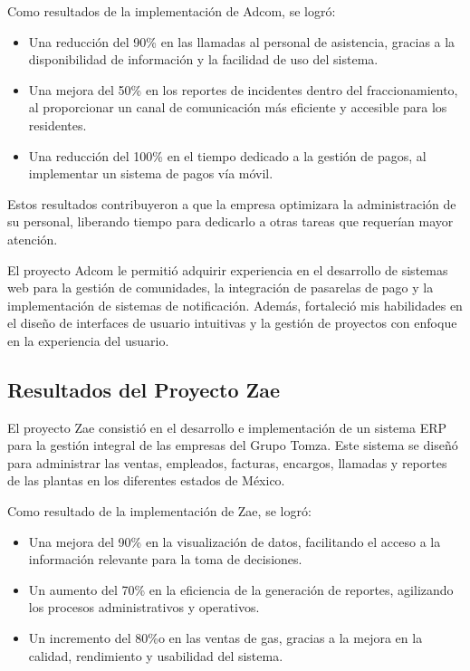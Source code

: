 \documentclass[protocolo.tex]{subfiles}
\begin{document}
Como resultados de la implementación de Adcom, se logró:

\begin{itemize}
\item Una reducción del 90\% en las llamadas al personal de asistencia,  gracias a la disponibilidad de información y la  facilidad  de  uso  del  sistema.
\item Una mejora del 50\% en los reportes de incidentes dentro del fraccionamiento,  al  proporcionar  un  canal  de  comunicación  más  eficiente  y  accesible  para  los  residentes.
\item Una reducción del 100\% en el tiempo dedicado a la gestión de pagos,  al  implementar  un  sistema  de  pagos  vía  móvil.
\end{itemize}

Estos resultados contribuyeron a que la empresa  optimizara la administración de su personal, liberando tiempo para dedicarlo a otras tareas que requerían  mayor  atención.\vspace{4mm}

El proyecto Adcom le permitió adquirir experiencia en el desarrollo de sistemas web para la gestión de comunidades,  la integración de pasarelas de pago y la  implementación  de  sistemas  de  notificación.  Además,  fortaleció  mis  habilidades  en  el  diseño  de  interfaces  de  usuario  intuitivas  y  la  gestión  de  proyectos  con  enfoque  en  la  experiencia  del  usuario.

\subsection{Resultados del Proyecto Zae}

El proyecto Zae consistió en el desarrollo e implementación de un sistema ERP para la gestión integral de las empresas del Grupo Tomza. Este sistema se diseñó para administrar las ventas, empleados, facturas, encargos, llamadas y reportes de las plantas en los diferentes estados de México.\vspace{4mm}

Como resultado de la implementación de Zae, se logró:

\begin{itemize}
\item Una mejora del 90\% en la visualización de datos,  facilitando el acceso a la información relevante para la toma de decisiones.
\item Un aumento del 70\% en la eficiencia de la generación de reportes,  agilizando los procesos administrativos y operativos.
\item Un incremento del 80\%o en las ventas de gas,  gracias a la mejora en la calidad, rendimiento y usabilidad del sistema.
\end{itemize}
\end{document}
